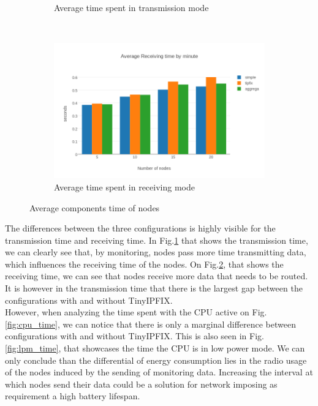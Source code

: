 \begin{figure}[h]
\begin{subfigure}[b]{0.45\textwidth}
        \caption{Average time spent in transmission mode}
        \label{fig:tx_time}
    \end{subfigure}
    ~
    \begin{subfigure}[b]{0.45\textwidth}
        \includegraphics[width=\textwidth]{res/average_rx}
        \caption{Average time spent in receiving mode}
        \label{fig:rx_time}
    \end{subfigure}
    \caption{Average components time of nodes}
    \label{fig:time_all}
\end{figure}

The differences between the three configurations is highly visible for the transmission time and receiving time. In Fig.\ref{fig:tx_time} that shows the transmission time, we can clearly see that, by monitoring, nodes pass more time transmitting data, which influences the receiving time of the nodes. On Fig.\ref{fig:rx_time}, that shows the receiving time, we can see that nodes receive more data that needs to be routed. It is however in the transmission time that there is the largest gap between the configurations with and without TinyIPFIX.\\

However, when analyzing the time spent with the CPU active on Fig.\ref{fig:cpu_time}, we can notice that there is only a marginal difference between configurations with and without TinyIPFIX. This is also seen in Fig.\ref{fig:lpm_time}, that showcases the time the CPU is in low power mode. We can only conclude than the differential of energy consumption lies in the radio usage of the nodes induced by the sending of monitoring data. Increasing the interval at which nodes send their data could be a solution for network imposing as requirement a high battery lifespan.\\

